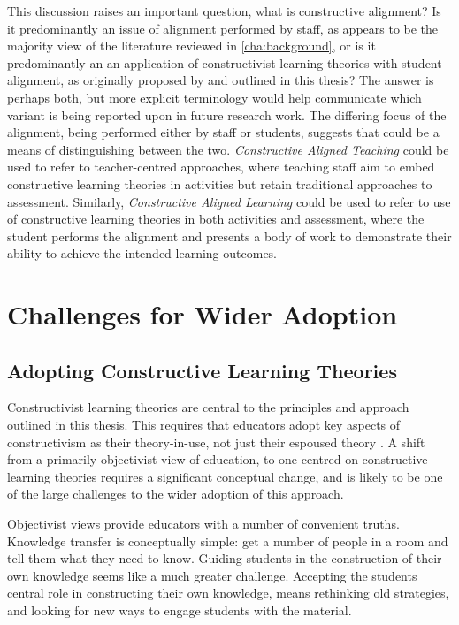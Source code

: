 This discussion raises an important question, what is constructive alignment? Is it predominantly an issue of alignment performed by staff, as appears to be the majority view of the literature reviewed in \cref{cha:background}, or is it predominantly an an application of constructivist learning theories with student alignment, as originally proposed by \citet{Biggs:1996c} and outlined in this thesis? The answer is perhaps both, but more explicit terminology would help communicate which variant is being reported upon in future research work. The differing focus of the alignment, being performed either by staff or students, suggests that could be a means of distinguishing between the two. \emph{Constructive Aligned Teaching} could be used to refer to teacher-centred approaches, where teaching staff aim to embed constructive learning theories in activities but retain traditional approaches to assessment. Similarly, \emph{Constructive Aligned Learning} could be used to refer to use of constructive learning theories in both activities and assessment, where the student performs the alignment and presents a body of work to demonstrate their ability to achieve the intended learning outcomes. 


\section{Challenges for Wider Adoption} %
\label{sec:challenges_for_wider_adoption}

\subsection{Adopting Constructive Learning Theories} %
\label{sub:adopting_constructive_learning_theories}

Constructivist learning theories are central to the principles and approach outlined in this thesis. This requires that educators adopt key aspects of constructivism as their theory-in-use, not just their espoused theory \cite{Argyris:1976}. A shift from a primarily objectivist view of education, to one centred on constructive learning theories requires a significant conceptual change, and is likely to be one of the large challenges to the wider adoption of this approach.  

Objectivist views provide educators with a number of convenient truths. Knowledge transfer is conceptually simple: get a number of people in a room and tell them what they need to know. Guiding students in the construction of their own knowledge seems like a much greater challenge. Accepting the students central role in constructing their own knowledge, means rethinking old strategies, and looking for new ways to engage students with the material. 


